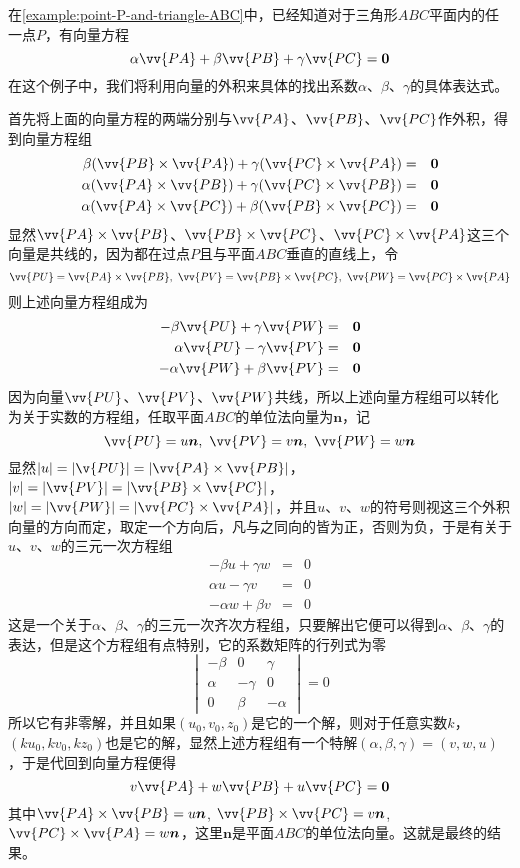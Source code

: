 \begin{example}
  在\autoref{example:point-P-and-triangle-ABC}中，已经知道对于三角形$ABC$平面内的任一点$P$，有向量方程
  \[ \alpha \vv{PA} + \beta \vv{PB} +\gamma \vv{PC} = \bm{0} \]
  在这个例子中，我们将利用向量的外积来具体的找出系数$\alpha$、$\beta$、$\gamma$的具体表达式。

  首先将上面的向量方程的两端分别与$\vv{PA}$、$\vv{PB}$、$\vv{PC}$作外积，得到向量方程组
  \begin{eqnarray*}
    \beta (\vv{PB}\times\vv{PA}) + \gamma (\vv{PC}\times\vv{PA}) & = & \bm{0} \\
    \alpha (\vv{PA}\times\vv{PB}) + \gamma (\vv{PC}\times\vv{PB}) & = & \bm{0} \\
    \alpha (\vv{PA}\times\vv{PC}) + \beta (\vv{PB}\times\vv{PC}) & = & \bm{0}
  \end{eqnarray*}
  显然$\vv{PA}\times\vv{PB}$、$\vv{PB}\times\vv{PC}$、$\vv{PC}\times\vv{PA}$这三个向量是共线的，因为都在过点$P$且与平面$ABC$垂直的直线上，令
  \[ \vv{PU}=\vv{PA}\times\vv{PB}, \  \vv{PV}=\vv{PB}\times\vv{PC}, \  \vv{PW}=\vv{PC}\times\vv{PA} \]
  则上述向量方程组成为
  \begin{eqnarray*}
    -\beta \vv{PU} + \gamma \vv{PW} & = & \bm{0} \\
    \alpha \vv{PU} - \gamma \vv{PV} & = & \bm{0} \\
    - \alpha \vv{PW} + \beta \vv{PV} & = & \bm{0}
  \end{eqnarray*}
  因为向量$\vv{PU}$、$\vv{PV}$、$\vv{PW}$共线，所以上述向量方程组可以转化为关于实数的方程组，任取平面$ABC$的单位法向量为$\bm{n}$，记
  \[ \vv{PU}=u\bm{n}, \  \vv{PV} = v\bm{n}, \  \vv{PW}=w\bm{n} \]
  显然$|u|=|\v{PU}|=|\vv{PA}\times\vv{PB}|$，$|v|=|\vv{PV}|=|\vv{PB}\times\vv{PC}|$，$|w|=|\vv{PW}|=|\vv{PC}\times\vv{PA}|$，并且$u$、$v$、$w$的符号则视这三个外积向量的方向而定，取定一个方向后，凡与之同向的皆为正，否则为负，于是有关于$u$、$v$、$w$的三元一次方程组
  \begin{eqnarray*}
    -\beta u + \gamma w & = & 0 \\
    \alpha u - \gamma v & = & 0 \\
    - \alpha w + \beta v & = & 0
  \end{eqnarray*}
  这是一个关于$\alpha$、$\beta$、$\gamma$的三元一次齐次方程组，只要解出它便可以得到$\alpha$、$\beta$、$\gamma$的表达，但是这个方程组有点特别，它的系数矩阵的行列式为零
  \[
    \begin{vmatrix}
      -\beta & 0 & \gamma \\
      \alpha & -\gamma & 0 \\
      0 & \beta & -\alpha
    \end{vmatrix}
    = 0
  \]
  所以它有非零解，并且如果$(u_0,v_0,z_0)$是它的一个解，则对于任意实数$k$，$(ku_0,kv_0,kz_0)$也是它的解，显然上述方程组有一个特解$(\alpha,\beta,\gamma)=(v,w,u)$，于是代回到向量方程便得
  \[ v \vv{PA} + w \vv{PB} + u \vv{PC} = \bm{0} \]
  其中$\vv{PA}\times\vv{PB}=u\bm{n}$, $\vv{PB}\times\vv{PC}=v\bm{n}$, $\vv{PC}\times\vv{PA}=w\bm{n}$，这里$\bm{n}$是平面$ABC$的单位法向量。这就是最终的结果。


\end{example}
